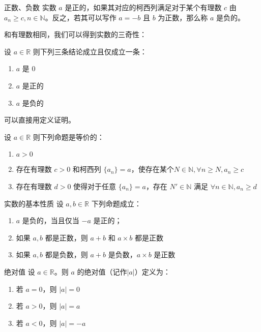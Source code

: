 \begin{definition}{正数、负数}{}
	实数 $a$ 是正的，如果其对应的柯西列满足对于某个有理数 $c$ 由 $a_n \ge c, n\in \mathbb N$。反之，若其可以写作 $a=-b$ 且 $b$ 为正数，那么称 $a$ 是负的。
\end{definition}

和有理数相同，我们可以得到实数的三奇性：

\begin{proposition}{}{}
	设 $a\in \mathbb R$ 则下列三条结论成立且仅成立一条：
	
	\begin{enumerate}
		\item $a$ 是 0
		\item $a$ 是正的
		\item $a$ 是负的
	\end{enumerate}
\end{proposition}

\begin{note}
	可以直接用定义证明。
\end{note}

\begin{proposition}{}{}
	设 $a\in \mathbb R$ 则下列命题是等价的：
	
	\begin{enumerate}
		\item $a > 0$
		\item 存在有理数 $c > 0$ 和柯西列 $\{a_n\}= a$，使存在某个$N \in \mathbb N, \forall n \ge N,a_n \ge c$
		\item 存在有理数 $d > 0$ 使得对于任意 $\{a_n\} = a$，存在 $N'\in \mathbb N$ 满足 $\forall n\in \mathbb N,a_n \ge d$
	\end{enumerate}
\end{proposition}

\begin{theorem}{实数的基本性质}{}
	设 $a,b\in \mathbb R$ 下列命题成立：
	
	\begin{enumerate}
		\item $a$ 是负的，当且仅当 $-a$ 是正的；
		\item 如果 $a,b$ 都是正数，则 $a+b$ 和 $a\times b$ 都是正数
		\item 如果 $a,b$ 都是负数，则 $a+b$ 是负数，$a\times b$ 是正数
	\end{enumerate}
\end{theorem}

\begin{definition}{绝对值}{}
	设 $a\in \mathbb R$。则 $a$ 的绝对值（记作$|a|$）定义为：
	\begin{enumerate}
		\item 若 $a=0$，则 $|a|=0$
		\item 若 $a > 0$，则 $|a|=a$
		\item 若 $a < 0$，则 $|a|=-a$
	\end{enumerate}
\end{definition}

